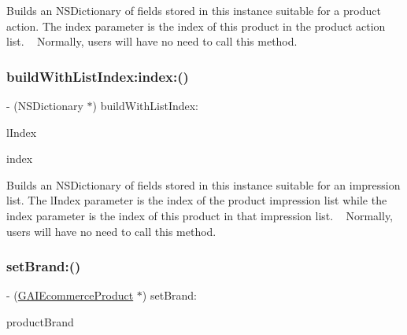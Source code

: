 Builds an N\+S\+Dictionary of fields stored in this instance suitable for a product action. The index parameter is the index of this product in the product action list. ~\newline
 Normally, users will have no need to call this method. \mbox{\label{interface_g_a_i_ecommerce_product_aa29f4f1f5c8339397ae37672d9b41f2b}} 
\subsubsection{\texorpdfstring{build\+With\+List\+Index\+:index\+:()}{buildWithListIndex:index:()}}
{\footnotesize\ttfamily -\/ (N\+S\+Dictionary $\ast$) build\+With\+List\+Index\+: \begin{DoxyParamCaption}\item[{(N\+S\+U\+Integer)}]{l\+Index }\item[{index:(N\+S\+U\+Integer)}]{index }\end{DoxyParamCaption}}

Builds an N\+S\+Dictionary of fields stored in this instance suitable for an impression list. The l\+Index parameter is the index of the product impression list while the index parameter is the index of this product in that impression list. ~\newline
 Normally, users will have no need to call this method. \mbox{\label{interface_g_a_i_ecommerce_product_a86fe25148b6e2f292bea2291765518bb}} 
\subsubsection{\texorpdfstring{set\+Brand\+:()}{setBrand:()}}
{\footnotesize\ttfamily -\/ (\hyperlink{interface_g_a_i_ecommerce_product}{G\+A\+I\+Ecommerce\+Product} $\ast$) set\+Brand\+: \begin{DoxyParamCaption}\item[{(N\+S\+String $\ast$)}]{product\+Brand }\end{DoxyParamCaption}}

